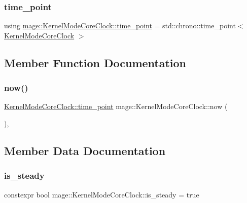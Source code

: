 \hypertarget{structmage_1_1_kernel_mode_core_clock_aca87172eb6e806a46d8792ca8239d2fe}{}\label{structmage_1_1_kernel_mode_core_clock_aca87172eb6e806a46d8792ca8239d2fe} 
\subsubsection{\texorpdfstring{time\+\_\+point}{time\_point}}
{\footnotesize\ttfamily using \hyperlink{structmage_1_1_kernel_mode_core_clock_aca87172eb6e806a46d8792ca8239d2fe}{mage\+::\+Kernel\+Mode\+Core\+Clock\+::time\+\_\+point} =  std\+::chrono\+::time\+\_\+point$<$ \hyperlink{structmage_1_1_kernel_mode_core_clock}{Kernel\+Mode\+Core\+Clock} $>$}



\subsection{Member Function Documentation}
\hypertarget{structmage_1_1_kernel_mode_core_clock_adc5563b83439f3f732708e0ecd7c5490}{}\label{structmage_1_1_kernel_mode_core_clock_adc5563b83439f3f732708e0ecd7c5490} 
\subsubsection{\texorpdfstring{now()}{now()}}
{\footnotesize\ttfamily \hyperlink{structmage_1_1_kernel_mode_core_clock_aca87172eb6e806a46d8792ca8239d2fe}{Kernel\+Mode\+Core\+Clock\+::time\+\_\+point} mage\+::\+Kernel\+Mode\+Core\+Clock\+::now (\begin{DoxyParamCaption}{ }\end{DoxyParamCaption})\hspace{0.3cm}{\ttfamily [static]}, {\ttfamily [noexcept]}}



\subsection{Member Data Documentation}
\hypertarget{structmage_1_1_kernel_mode_core_clock_a9b1fe608c5b68bfbe0dc07fefcd5a227}{}\label{structmage_1_1_kernel_mode_core_clock_a9b1fe608c5b68bfbe0dc07fefcd5a227} 
\subsubsection{\texorpdfstring{is\+\_\+steady}{is\_steady}}
{\footnotesize\ttfamily constexpr bool mage\+::\+Kernel\+Mode\+Core\+Clock\+::is\+\_\+steady = true\hspace{0.3cm}{\ttfamily [static]}}

